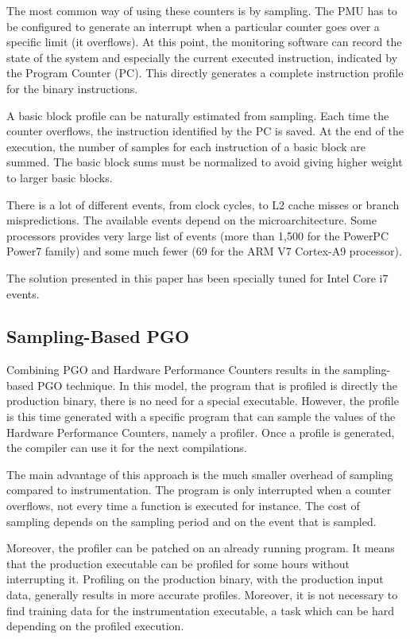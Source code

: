 \documentclass[9pt,english,twocolumn,letter]{article}
\begin{document}
The most common way of using these counters is by sampling. The PMU has to be configured to generate an interrupt when a particular counter goes over a specific limit (it overflows). At this point, the monitoring software can record the state of the system and especially the current executed instruction, indicated by the Program Counter (PC). This directly generates a complete instruction profile for the binary instructions.

A basic block profile can be naturally estimated from sampling. Each time the counter overflows, the instruction identified by the PC is saved. At the end of the execution, the number of samples for each instruction of a basic block are summed. The basic block sums must be normalized to avoid giving higher weight to larger basic blocks.

There is a lot of different events, from clock cycles, to L2 cache misses or branch mispredictions. The available events depend on the microarchitecture. Some processors provides very large list of events (more than 1,500 for the PowerPC Power7 family) and some much fewer (69 for the ARM V7 Cortex-A9 processor).

The solution presented in this paper has been specially tuned for Intel\textsuperscript{\textregistered} Core\textsuperscript{\texttrademark} i7 events\cite{Levinthal2009}.

\subsection{Sampling-Based PGO}

Combining PGO and Hardware Performance Counters results in the sampling-based PGO technique. In this model, the program that is profiled is directly the production binary, there is no need for a special executable. However, the profile is this time generated with a specific program that can sample the values of the Hardware Performance Counters, namely a profiler. Once a profile is generated, the compiler can use it for the next compilations.

The main advantage of this approach is the much smaller overhead of sampling compared to instrumentation. The program is only interrupted when a counter overflows, not every time a function is executed for instance. The cost of sampling depends on the sampling period and on the event that is sampled.

Moreover, the profiler can be patched on an already running program. It means that the production executable can be profiled for some hours without interrupting it. Profiling on the production binary, with the production input data, generally results in more accurate profiles. Moreover, it is not necessary to find training data for the instrumentation executable, a task which can be hard depending on the profiled execution.
\end{document}
